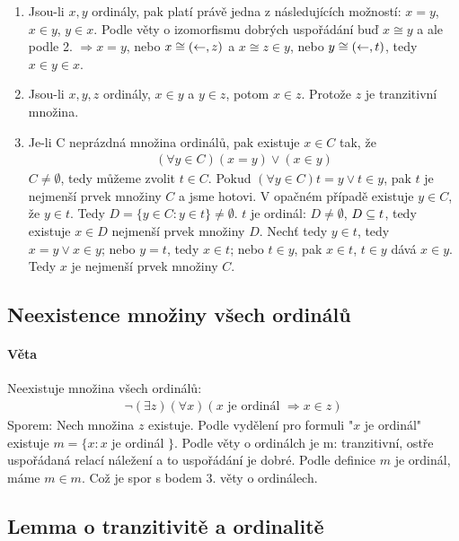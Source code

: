 \documentclass[a4paper,12pt,titlepage]{article}
\begin{document}
\begin{enumerate}
	\item Jsou-li $x,y$ ordinály, pak platí právě jedna z následujících
	možností: $x = y$, $x \in y$, $y \in x$. Podle věty o izomorfismu dobrých
	uspořádání buď $x \cong y$ a ale podle 2. $\Rightarrow x = y$, nebo $x \cong
	(\leftarrow, z)$ a $x \cong z \in y$, nebo $y \cong (\leftarrow, t)$, tedy $x \in y \in x$.


	\item Jsou-li $x, y, z$ ordinály, $x \in y$ a $y \in z$, potom $x \in z$.
	Protože $z$ je tranzitivní množina.
	
	\item Je-li C neprázdná množina ordinálů, pak existuje $x \in C$ tak, že
	\begin{align}
		(\forall y \in C) (x = y) \lor (x \in y)
	\end{align}
	$C \neq \emptyset$, tedy můžeme zvolit  $t \in C$. Pokud $(\forall y \in C) t = y \lor t \in y$, 
	pak $t$ je nejmenší prvek množiny $C$ a jsme hotovi.
	V opačném případě existuje $y \in C$, že $y \in t$.
	Tedy $D = \{ y \in C : y \in t \} \neq \emptyset$. $t$ je ordinál: $D \neq
	\emptyset$, $D \subseteq t$, tedy existuje $x \in D$ nejmenší prvek množiny
	$D$. Nechť tedy $y \in t$, tedy $x = y \lor x \in y$; nebo $y = t$, tedy $x
	\in t$; nebo $t \in y$, pak $x \in t$, $t \in y$ dává $x \in y$. Tedy $x$ je nejmenší
	prvek množiny $C$.
\end{enumerate}


\subsection{Neexistence množiny všech ordinálů}
\setcounter{equation}{0}
\paragraph{Věta}
Neexistuje množina všech ordinálů:
\begin{align}
	\neg (\exists z) (\forall x) (x \text{ je ordinál } \Rightarrow x \in z)
\end{align}
Sporem: Nech množina $z$ existuje. Podle vydělení pro formuli "$x$ je ordinál"
existuje $m = \{ x :  x$ je ordinál $ \}$. Podle věty o ordinálch je m:
tranzitivní, ostře uspořádaná relací náležení a to uspořádání je dobré. Podle
definice $m$ je ordinál, máme $m \in m$. Což je spor s bodem 3. věty o
ordinálech.

\subsection{Lemma o tranzitivitě a ordinalitě}
\setcounter{equation}{0}
\end{document}
